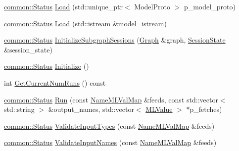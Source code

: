 \begin{DoxyCompactItemize}
\item 
\mbox{\hyperlink{classonnxruntime_1_1common_1_1Status}{common\+::\+Status}} \mbox{\hyperlink{classonnxruntime_1_1InferenceSession_1_1Impl_ae5261dacd059d34dd6cf6c9d9580573a}{Load}} (std\+::unique\+\_\+ptr$<$ Model\+Proto $>$ p\+\_\+model\+\_\+proto)
\item 
\mbox{\hyperlink{classonnxruntime_1_1common_1_1Status}{common\+::\+Status}} \mbox{\hyperlink{classonnxruntime_1_1InferenceSession_1_1Impl_aed3e1f755e7f0cfc675c2d9ebdea7a88}{Load}} (std\+::istream \&model\+\_\+istream)
\item 
\mbox{\hyperlink{classonnxruntime_1_1common_1_1Status}{common\+::\+Status}} \mbox{\hyperlink{classonnxruntime_1_1InferenceSession_1_1Impl_a960c8120174f33252f37eeb1e8403aee}{Initialize\+Subgraph\+Sessions}} (\mbox{\hyperlink{classonnxruntime_1_1Graph}{Graph}} \&graph, \mbox{\hyperlink{classonnxruntime_1_1SessionState}{Session\+State}} \&session\+\_\+state)
\item 
\mbox{\hyperlink{classonnxruntime_1_1common_1_1Status}{common\+::\+Status}} \mbox{\hyperlink{classonnxruntime_1_1InferenceSession_1_1Impl_add71ebf6fe7b8ba355062292c8e1d51e}{Initialize}} ()
\item 
int \mbox{\hyperlink{classonnxruntime_1_1InferenceSession_1_1Impl_a8d653e7f84e8c434bffc3253d7775562}{Get\+Current\+Num\+Runs}} () const
\item 
\mbox{\hyperlink{classonnxruntime_1_1common_1_1Status}{common\+::\+Status}} \mbox{\hyperlink{classonnxruntime_1_1InferenceSession_1_1Impl_a3638c45d73a93fff19578b4e1be0fc34}{Run}} (const \mbox{\hyperlink{namespaceonnxruntime_a48b01f0410ec8d693dbd40d1132bd66c}{Name\+M\+L\+Val\+Map}} \&feeds, const std\+::vector$<$ std\+::string $>$ \&output\+\_\+names, std\+::vector$<$ \mbox{\hyperlink{classonnxruntime_1_1MLValue}{M\+L\+Value}} $>$ $\ast$p\+\_\+fetches)
\item 
\mbox{\hyperlink{classonnxruntime_1_1common_1_1Status}{common\+::\+Status}} \mbox{\hyperlink{classonnxruntime_1_1InferenceSession_1_1Impl_a10de0bc3bca4ef1e0698c44719358441}{Validate\+Input\+Types}} (const \mbox{\hyperlink{namespaceonnxruntime_a48b01f0410ec8d693dbd40d1132bd66c}{Name\+M\+L\+Val\+Map}} \&feeds)
\item 
\mbox{\hyperlink{classonnxruntime_1_1common_1_1Status}{common\+::\+Status}} \mbox{\hyperlink{classonnxruntime_1_1InferenceSession_1_1Impl_ae5d568d42648477ec13680cef613cbb2}{Validate\+Input\+Names}} (const \mbox{\hyperlink{namespaceonnxruntime_a48b01f0410ec8d693dbd40d1132bd66c}{Name\+M\+L\+Val\+Map}} \&feeds)

\end{DoxyCompactItemize}
